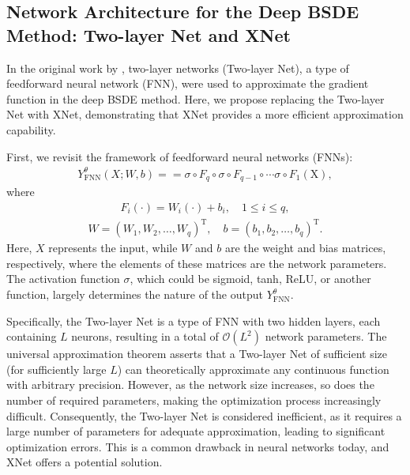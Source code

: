 \documentclass[11pt]{article}
\begin{document}
\subsection{Network Architecture for the Deep BSDE Method: Two-layer Net and XNet}
In the original work by \textsuperscript{\cite{E2017}}, two-layer networks (Two-layer Net), a type of feedforward neural network (FNN), were used to approximate the gradient function in the deep BSDE method. Here, we propose replacing the Two-layer Net with XNet, demonstrating that XNet provides a more efficient approximation capability.

First, we revisit the framework of feedforward neural networks (FNNs):
\begin{equation}\label{FNN}
	\begin{aligned}
		Y_{\text{FNN}}^\theta(X;W,b)==\sigma\circ F_q \circ\sigma\circ F_{q-1}\circ\cdots\sigma\circ F_1(\mathrm{X}),
	\end{aligned}
\end{equation}
where
\begin{equation}\label{FNN_F1}
	\begin{aligned}
		F_i(\cdot)=W_i(\cdot)+b_i, \quad 1 \le i \le q, 
	\end{aligned}
\end{equation}
\begin{equation}\label{FNN_F2}
	\begin{aligned}
		W = \left(W_1, W_2, \dots, W_q \right)^\mathrm{T}, \quad b = \left(b_1, b_2, \dots, b_q \right)^\mathrm{T}.
	\end{aligned}
\end{equation}
Here, $X$ represents the input, while $W$ and $b$ are the weight and bias matrices, respectively, where the elements of these matrices are the network parameters. 
The activation function \( \sigma \), which could be sigmoid, tanh, ReLU, or another function, largely determines the nature of the output \( Y_{\text{FNN}}^\theta \).


Specifically, the Two-layer Net is a type of FNN with two hidden layers, each containing $L$ neurons, resulting in a total of \(\mathcal{O}(L^2)\) network parameters. The universal approximation theorem asserts that a Two-layer Net of sufficient size (for sufficiently large $L$) can theoretically approximate any continuous function with arbitrary precision. However, as the network size increases, so does the number of required parameters, making the optimization process increasingly difficult.
Consequently, the Two-layer Net is considered inefficient, as it requires a large number of parameters for adequate approximation, leading to significant optimization errors. This is a common drawback in neural networks today, and XNet offers a potential solution.
\end{document}

